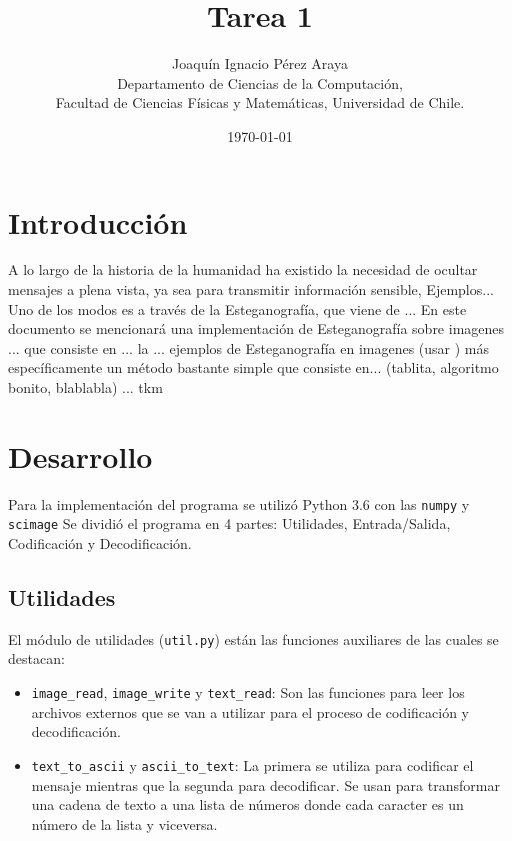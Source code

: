 \documentclass{article}
\begin{document}
\title{Tarea 1 }
\author{Joaquín Ignacio Pérez Araya\footnotemark \\ Departamento de Ciencias de la Computación, \\ Facultad de Ciencias Físicas y Matemáticas, Universidad de Chile.}
\date{\today}


\maketitle

\begin{abstract}

\end{abstract}

\section*{Introducción} %
    A lo largo de la historia de la humanidad ha existido la necesidad de ocultar mensajes a plena vista, ya sea para transmitir información sensible,   Ejemplos...
    Uno de los modos es a través de la Esteganografía, que viene de ...
    En este documento se mencionará una implementación de Esteganografía sobre imagenes ... que consiste en ... la
    ... ejemplos de Esteganografía en imagenes (usar \cite{DIS})
    más específicamente un método bastante simple que consiste en...
    (tablita, algoritmo bonito, blablabla)
    ...
    tkm

\section*{Desarrollo}
	Para la implementación del programa se utilizó Python 3.6 con las \texttt{numpy} y     
	\texttt{scimage}
	Se dividió el programa en 4 partes: Utilidades, Entrada/Salida, Codificación y Decodificación.
	\subsection*{Utilidades}
	El módulo de utilidades (\texttt{util.py}) están las funciones auxiliares de las cuales se destacan:
	\begin{itemize}
	    \item \texttt{image\_read}\footnotemark, \texttt{image\_write} y \texttt{text\_read}: Son las funciones para leer los archivos externos que se van a utilizar para el proceso de codificación y decodificación.
         
	    	    
        \item \texttt{text\_to\_ascii} y \texttt{ascii\_to\_text}: La primera se utiliza para codificar el mensaje mientras que la segunda para decodificar. Se usan para transformar una cadena de texto a una lista de números donde cada caracter es un número de la lista y viceversa.
        
	\end{itemize}
	
\end{document}
